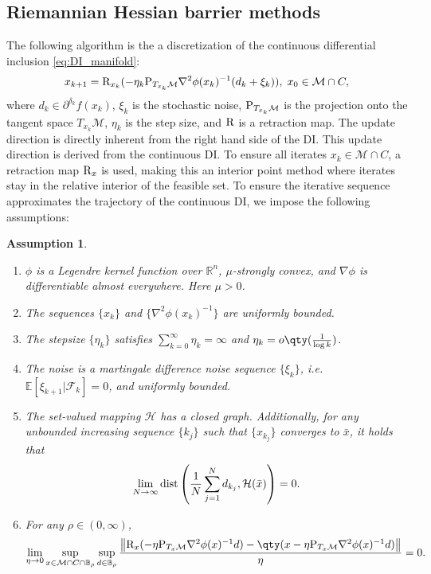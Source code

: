 \documentclass[11pt]{article}
\newcommand{\R}{\mathbb R}
\newcommand{\E}{\mathbb{E}}
\newcommand{\cF}{\mathcal F}
\newcommand{\cM}{\mathcal M}
\def\norm#1{\left\|#1\right\|}
\newtheorem{assumption}{Assumption}[section]
\begin{document}
\subsection{Riemannian Hessian barrier methods}
The following algorithm is the a discretization of the continuous differential inclusion \eqref{eq:DI_manifold}:
\begin{equation}
\label{eq:alg-RHBA}
x_{k+1}={\rm R}_{x_k}(-\eta_k{\rm P}_{T_{x_k}\cM}\nabla^2\phi(x_k)^{-1}(d_k+\xi_k)),\;x_0\in\cM\cap C,
\end{equation}
where $d_k\in\partial^{\delta_k}f(x_k)$, $\xi_k$ is the stochastic noise, $ {\rm P}_{T_{x_k} \mathcal{M}} $ is the projection onto the tangent space $ T_{x_k} \mathcal{M}$, $ \eta_k $ is the step size, and ${\rm R}$ is a retraction map. The update direction is directly inherent from the right hand side of the DI. This update direction is derived from the continuous DI. To ensure all iterates $ x_k \in \mathcal{M} \cap C $, a retraction map $ {\rm R}_x $ is used, making this an interior point method where iterates stay in the relative interior of the feasible set. To ensure the iterative sequence approximates the trajectory of the continuous DI, we impose the following assumptions:
\begin{assumption}
\label{assumption:alg}
    \begin{enumerate}
        \item {$\phi$ is a Legendre kernel function over $\R^n$}, $\mu$-strongly convex, and $\nabla\phi$ is differentiable almost everywhere. Here $\mu>0$.
        \item The sequences $\{x_k\}$ and $\{\nabla^2\phi(x_k)^{-1}\}$ are uniformly bounded.
        \item The stepsize $\{\eta_k\}$ satisfies $\sum_{k=0}^\infty\eta_k=\infty$ and $\eta_k=o\qty(\frac{1}{\log k})$.
        \item The noise is a martingale difference noise sequence $\{\xi_k\}$,  i.e. $\E[\xi_{k+1}|\cF_k]=0$, and uniformly bounded. 
               
        \item The set-valued mapping $\mathcal{H}$ has a closed graph. Additionally, for any unbounded increasing sequence $\{k_j\}$ such that $\{x_{k_j}\}$ converges to $\bar x$, it holds that 
        \begin{equation}
            \lim_{N\rightarrow\infty}{\rm dist}\left(\frac{1}{N}\sum_{j=1}^Nd_{k_j},\mathcal{H}(\bar x)\right)=0.
        \end{equation}
        \item For any $\rho\in(0,\infty)$,
        \[
        \lim_{\eta\to0}\sup_{x\in\cM\cap C\cap\mathbb{B}_\rho}\sup_{d\in\mathbb{B}_{\rho}}\frac{\norm{{\rm R}_x(-\eta{\rm P}_{T_x\cM}\nabla^2\phi(x)^{-1}d)-\qty(x-\eta{\rm P}_{T_x\cM}\nabla^2\phi(x)^{-1}d)}}{\eta}=0.
        \]
    \end{enumerate}
\end{assumption}
\end{document}
